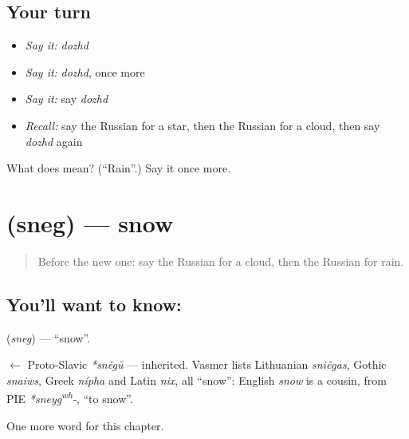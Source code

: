 \subsection*{Your turn}
\begin{itemize}
\raggedright
  \item \emph{Say it:} \emph{dozhd}
  \item \emph{Say it:} \emph{dozhd}, once more
  \item \emph{Say it:} say \emph{dozhd}
  \item \emph{Recall:} say the Russian for a star, then the Russian for a cloud, then say \emph{dozhd} again
\end{itemize}

\begin{tcolorbox}[breakable,colback=teal!4,colframe=teal!35!black,title={Before you move on}]
What does  mean? (\textquotedblleft{}Rain\textquotedblright{}.) Say it once more.
\end{tcolorbox}
\section[\texorpdfstring{\ru{снег} (sneg)}{снег (sneg)}]{ (sneg) — snow}

\label{lesson:RU-C59-snow}



\begin{quote}
Before the new one: say the Russian for a cloud, then the Russian for rain.
\end{quote}

\subsection*{You'll want to know: }
\textbf{} (\emph{sneg}) — \textquotedblleft{}snow\textquotedblright{}.

\begin{cousinweb}
\textbf{} $\leftarrow$ Proto-Slavic \emph{*sněgŭ} — inherited. Vasmer lists Lithuanian \emph{sniẽgas}, Gothic \emph{snaiws}, Greek \emph{nípha} and Latin \emph{nix}, all \textquotedblleft{}snow\textquotedblright{}: English \emph{snow} is a cousin, from PIE \emph{*sneyg\textsuperscript{w}\textsuperscript{h}-}, \textquotedblleft{}to snow\textquotedblright{}.
\end{cousinweb}

\begin{grammarlens}[title={What you've built}]
One more word for this chapter.
\end{grammarlens}

